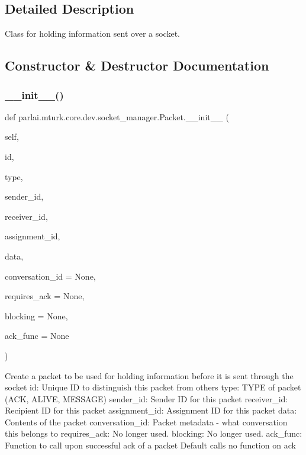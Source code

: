 \subsection{Detailed Description}
\begin{DoxyVerb}Class for holding information sent over a socket.
\end{DoxyVerb}
 

\subsection{Constructor \& Destructor Documentation}
\mbox{\label{classparlai_1_1mturk_1_1core_1_1dev_1_1socket__manager_1_1Packet_a7e36ad36f81a8e412efa30404b7dd07d}} 
\subsubsection{\texorpdfstring{\+\_\+\+\_\+init\+\_\+\+\_\+()}{\_\_init\_\_()}}
{\footnotesize\ttfamily def parlai.\+mturk.\+core.\+dev.\+socket\+\_\+manager.\+Packet.\+\_\+\+\_\+init\+\_\+\+\_\+ (\begin{DoxyParamCaption}\item[{}]{self,  }\item[{}]{id,  }\item[{}]{type,  }\item[{}]{sender\+\_\+id,  }\item[{}]{receiver\+\_\+id,  }\item[{}]{assignment\+\_\+id,  }\item[{}]{data,  }\item[{}]{conversation\+\_\+id = {\ttfamily None},  }\item[{}]{requires\+\_\+ack = {\ttfamily None},  }\item[{}]{blocking = {\ttfamily None},  }\item[{}]{ack\+\_\+func = {\ttfamily None} }\end{DoxyParamCaption})}

\begin{DoxyVerb}Create a packet to be used for holding information before it is
sent through the socket
id:               Unique ID to distinguish this packet from others
type:             TYPE of packet (ACK, ALIVE, MESSAGE)
sender_id:        Sender ID for this packet
receiver_id:      Recipient ID for this packet
assignment_id:    Assignment ID for this packet
data:             Contents of the packet
conversation_id:  Packet metadata - what conversation this belongs to
requires_ack:     No longer used.
blocking:         No longer used.
ack_func:         Function to call upon successful ack of a packet
           Default calls no function on ack
\end{DoxyVerb}
 

